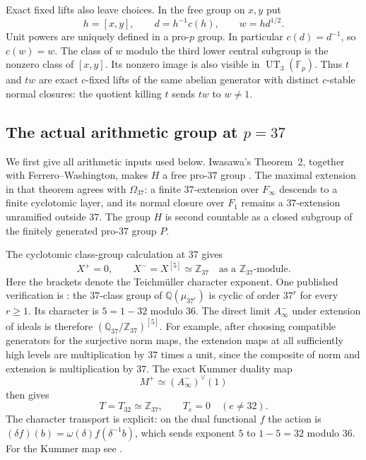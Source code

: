 Exact fixed lifts also leave choices.  In the free group on $x,y$ put
\[
 h=[x,y],\qquad d=h^{-1}c(h),\qquad w=h d^{1/2}.
\]
Unit powers are uniquely defined in a pro-$p$ group.  In particular
$c(d)=d^{-1}$, so $c(w)=w$.  The class of $w$ modulo the third lower
central subgroup is the nonzero class of $[x,y]$.  Its nonzero image
is also visible in $\operatorname{UT}_3(\mathbb F_p)$.
Thus $t$ and $tw$ are exact $c$-fixed lifts of the same abelian
generator with distinct $c$-stable normal closures: the quotient
killing $t$ sends $tw$ to $w\ne1$.

\subsection{The actual arithmetic group at $p=37$}

We first give all arithmetic inputs used below.  Iwasawa's
Theorem~2, together with Ferrero--Washington, makes $H$ a free
pro-$37$ group
\cite[Theorem~2, pp.~273--274]{Iwasawa,FW}.
The maximal extension in that theorem agrees with $\Omega_{37}$:
a finite $37$-extension over $F_\infty$ descends to a finite
cyclotomic layer, and its normal closure over $F_1$ remains a
$37$-extension unramified outside $37$.  The group $H$ is
second countable as a closed subgroup of the finitely generated
pro-$37$ group $P$.

The cyclotomic class-group calculation at $37$ gives
\begin{equation}\label{eq:component-p37-class-input}
 X^+=0,\qquad
 X^-=X^{[5]}\simeq\mathbb Z_{37}\quad
 \text{as a $\mathbb Z_{37}$-module}.
\end{equation}
Here the brackets denote the Teichm\"uller character exponent.
One published verification is
\cite[\S1, items~(2)--(3)]{HHO}: the $37$-class group
of $\mathbb Q(\mu_{37^r})$ is cyclic of order $37^r$ for every
$r\ge1$.  Its character is $5=1-32$ modulo $36$.
The direct limit $A_\infty^-$ under extension of ideals is therefore
$(\mathbb Q_{37}/\mathbb Z_{37})^{[5]}$.
For example, after choosing compatible generators for the
surjective norm maps, the extension maps at all sufficiently high
levels are multiplication by $37$ times a unit, since the composite
of norm and extension is multiplication by $37$.
The exact Kummer duality map
\[
 M^+\simeq(A_\infty^-)^\vee(1)
\]
then gives
\begin{equation}\label{eq:component-p37-even}
 T=T_{32}\simeq\mathbb Z_{37},\qquad T_e=0\quad(e\ne32).
\end{equation}
The character transport is explicit: on the dual functional
$f$ the action is $(\delta f)(b)=\omega(\delta)f(\delta^{-1}b)$,
which sends exponent $5$ to $1-5=32$ modulo $36$.
For the Kummer map see
\cite[Theorem~2.3.18]{SharifiCyclotomicNotes}.

